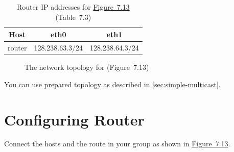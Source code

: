 \documentclass{../UTNetLab}
\begin{document}
\begin{table}[H]
    \caption{Router IP addresses for \hyperref[fig:7.13]{Figure~7.13} (Table~7.3)}
    \label{tab:7.3}
    \centering
    \begin{tabular}{ *3c }
        \hline \hline
        Host   & eth0            & eth1            \\
        \hline
        router & 128.238.63.3/24 & 128.238.64.3/24 \\
        \hline \hline
    \end{tabular}
\end{table}

\begin{figure}[H]
    \centering
    \caption{The network topology for  (Figure~7.13)}
    \label{fig:7.13}
\end{figure}


You can use prepared topology as described in \autoref{sec:simple-multicast}.

\section{Configuring Router}
\label{sec:config-router}
Connect the hosts and the route in your group as shown in \hyperref[fig:7.13]{Figure~7.13}.
\end{document}

